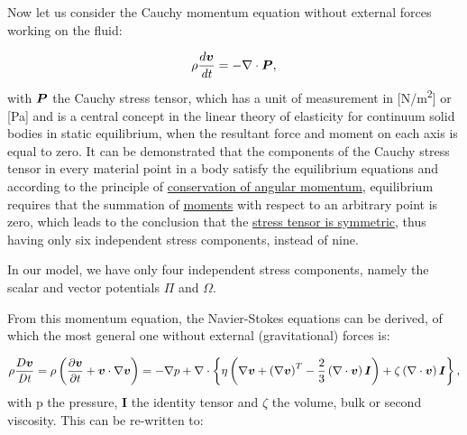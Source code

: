 \documentclass[a4paper]{article}
\newcommand\textstyleNone[1]{#1}
\newcommand\textstyleInternetlink[1]{#1}
\newcommand\textstyletexhtml[1]{#1}
\newcommand\boldsubformula[1]{\text{\mathversion{bold}$#1$}}
\begin{document}
{
Now let us consider \textstyleNone{{the Cauchy momentum equation
without external forces working on the }{fluid:}}}

\begin{equation}
\rho \frac{d\boldsubformula v}{\mathit{dt}}=-\nabla \cdot \boldsubformula P,
\end{equation}
\textstyleNone{{with }} $\boldsubformula P$
\textstyleNone{{ the Cauchy stress tensor, which has a unit of
measurement in
[N/m}{\textsuperscript{2}}{]
or [Pa] and is a central concept in the linear theory of elasticity for continuum solid bodies in static
}}{equilibrium, }when the resultant force and moment on each axis
is equal to zero.{ It can be demonstrated that the components of
the Cauchy stress tensor in every material point in a body satisfy the equilibrium }equations
{and according to the principle of
}\href{https://en.wikipedia.org/wiki/Conservation_of_angular_momentum}{\textstyleInternetlink{conservation of angular
momentum}}{, equilibrium requires that the summation of
}\href{https://en.wikipedia.org/wiki/Torque}{\textstyleInternetlink{moments}}{
with respect to an arbitrary point is zero, which leads to the conclusion that the
}\href{https://en.wikipedia.org/wiki/Stress_(mechanics)#Equilibrium_equations_and_symmetry_of_the_stress_tensor}{\textstyleInternetlink{stress
tensor is symmetric}}{, thus having only six independent stress
components, instead of nine.}

{In our model, we have only four independent stress components,
namely the scalar and vector potentials $\Pi $ and
}\textbf{{$\Omega $}}.

From this momentum equation, the Navier-Stokes equations can be derived, of which the most general one without external
(gravitational) forces is:

\begin{equation}
\rho \frac{D\boldsubformula v}{\mathit{Dt}}=\rho \left(\frac{\partial \boldsubformula v}{\partial t}+\boldsubformula
v\cdot \nabla \boldsubformula v\right)=-\nabla p+\nabla \cdot \left\{\eta \left(\nabla \boldsubformula v+\left(\nabla
\boldsubformula v\right)^T-\frac 2 3\left(\nabla \cdot \boldsubformula v\right)\boldsubformula I\right)+\zeta
\left(\nabla \cdot \boldsubformula v\right)\boldsubformula I\right\},
\end{equation}
\textstyleNone{{with p the pressure, }}\textstyletexhtml{\textbf{I}}
the identity tensor and  $\zeta $  \textstyleNone{{the volume, bulk
or second viscosity. This can be re-written to:}}
\end{document}

